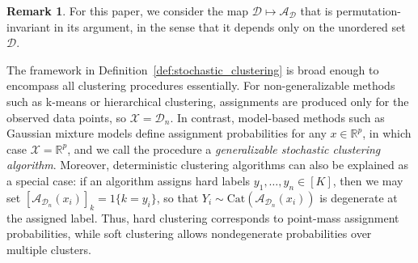 \documentclass[11pt,letterpaper]{article}
\theoremstyle{definition}
\newtheorem{remark}{Remark}
\newcommand{\cD}{\mathcal{D}}
\newcommand{\R}{\mathbb{R}}
\begin{document}
\begin{remark}
    For this paper, we consider the map $\cD \mapsto \mathcal A_{\cD}$ that is permutation-invariant in its argument, in the sense that it depends only on the unordered set $\cD$.
\end{remark}

The framework in Definition~\ref{def:stochastic_clustering} is broad enough to encompass all clustering procedures essentially. For non-generalizable methods such as k-means or hierarchical clustering, assignments are produced only for the observed data points, so $\mathcal X=\cD_n$. In contrast, model-based methods such as Gaussian mixture models define assignment probabilities for any $x\in\R^p$, in which case $\mathcal X=\R^p$, and we call the procedure a \emph{generalizable stochastic clustering algorithm}. Moreover, deterministic clustering algorithms can also be explained as a special case: if an algorithm assigns hard labels $y_1,\ldots,y_n\in[K]$, then we may set $\left[\mathcal A_{\cD_n}(x_i)\right]_k= 1\{k=y_i\}$, so that $Y_i\sim\mathrm{Cat}(\mathcal A_{\cD_n}(x_i))$ is degenerate at the assigned label. Thus, hard clustering corresponds to point-mass assignment probabilities, while soft clustering allows nondegenerate probabilities over multiple clusters.
\end{document}
